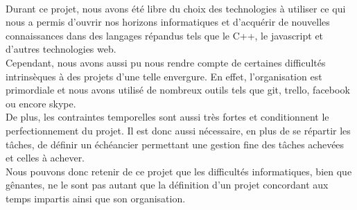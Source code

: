 \paragraph{}

Durant ce projet, nous avons été libre du choix des technologies à utiliser ce qui nous a permis d'ouvrir nos horizons informatiques et d'acquérir de nouvelles connaissances dans des langages répandus tels que le C++, le javascript et d'autres technologies web. \\
Cependant, nous avons aussi pu nous rendre compte de certaines difficultés intrinsèques à des projets d'une telle envergure. En effet, l'organisation est primordiale et nous avons utilisé de nombreux outils tels que git, trello, facebook ou encore skype.\\
De plus, les contraintes temporelles sont aussi très fortes et conditionnent le perfectionnement du projet. Il est donc aussi nécessaire, en plus de se répartir les tâches, de définir un échéancier permettant une gestion fine des tâches achevées et celles à achever. \\
Nous pouvons donc retenir de ce projet que les difficultés informatiques, bien que gênantes, ne le sont pas autant que la définition d'un projet concordant aux temps impartis ainsi que son organisation.